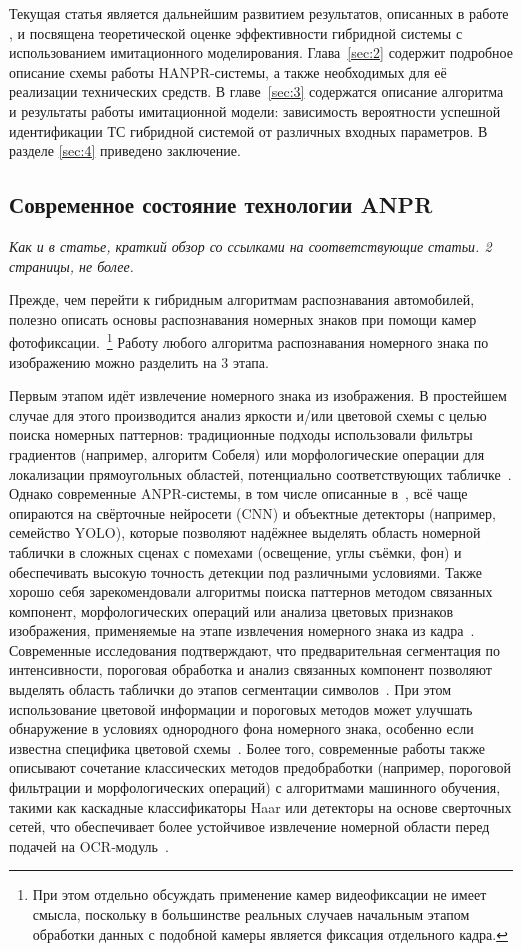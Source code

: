 \documentclass[12pt]{article}
\theoremstyle{definition}
\begin{document}
Текущая статья является дальнейшим развитием результатов, описанных в работе \cite{Larionov2022hybrid}, и посвящена теоретической оценке эффективности гибридной системы с использованием имитационного моделирования. Глава~\ref{sec:2} содержит подробное описание схемы работы HANPR-системы, а также необходимых для её реализации технических средств. В главе~\ref{sec:3} содержатся описание алгоритма и результаты работы имитационной модели: зависимость вероятности успешной идентификации ТС гибридной системой от различных входных параметров. В разделе \ref{sec:4} приведено заключение.

\subsection{Современное состояние технологии ANPR }
\textit{Как и в статье, краткий обзор со ссылками на соответствующие статьи. 2 страницы, не более.}

Прежде, чем перейти к гибридным алгоритмам распознавания автомобилей, полезно описать основы распознавания номерных знаков при помощи камер фотофиксации.~\footnote{При этом отдельно обсуждать применение камер видеофиксации не имеет смысла, поскольку в большинстве реальных случаев начальным этапом обработки данных с подобной камеры является фиксация отдельного кадра.} Работу любого алгоритма распознавания номерного знака по изображению можно разделить на 3 этапа.

Первым этапом идёт извлечение номерного знака из изображения. В простейшем случае для этого производится анализ яркости и/или цветовой схемы с целью поиска номерных паттернов: традиционные подходы использовали фильтры градиентов (например, алгоритм Собеля) или морфологические операции для локализации прямоугольных областей, потенциально соответствующих табличке~\cite{ashourian2013real}. Однако современные ANPR‑системы, в том числе описанные в~\cite{Sonnara2025}, всё чаще опираются на свёрточные нейросети (CNN) и объектные детекторы (например, семейство YOLO), которые позволяют надёжнее выделять область номерной таблички в сложных сценах с помехами (освещение, углы съёмки, фон) и обеспечивать высокую точность детекции под различными условиями. Также хорошо себя зарекомендовали алгоритмы поиска паттернов методом связанных компонент, морфологических операций или анализа цветовых признаков изображения, применяемые на этапе извлечения номерного знака из кадра~\cite{slimani2019vehicle}. Современные исследования подтверждают, что предварительная сегментация по интенсивности, пороговая обработка и анализ связанных компонент позволяют выделять область таблички до этапов сегментации символов~\cite{Kumawat2023}. При этом использование цветовой информации и пороговых методов может улучшать обнаружение в условиях однородного фона номерного знака, особенно если известна специфика цветовой схемы~\cite{Kumawat2023}. Более того, современные работы также описывают сочетание классических методов предобработки (например, пороговой фильтрации и морфологических операций) с алгоритмами машинного обучения, такими как каскадные классификаторы Haar или детекторы на основе сверточных сетей, что обеспечивает более устойчивое извлечение номерной области перед подачей на OCR‑модуль~\cite{Upadhye2025}.
\end{document}
